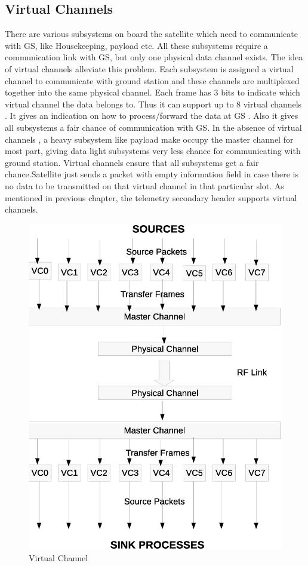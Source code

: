 \documentclass[BTech]{iitmdiss}
\begin{document}
\subsection{Virtual Channels}
There are various subsystems on board the satellite which need to communicate with GS, like Housekeeping, payload  etc. All these subsystems require a communication link with GS, but only one physical data channel exists. The idea of virtual channels alleviate this problem. Each subsystem is assigned a virtual channel to communicate with ground station and these channels are multiplexed together into the same physical channel. Each frame has 3 bits to indicate which virtual channel the data  belongs to. Thus it can support up to 8 virtual channels . It gives an indication on how to process/forward  the data at GS . Also it gives all subsystems a fair chance of communication with GS. In the absence of virtual channels , a heavy subsystem like payload make occupy the master channel for most part, giving data light subsystems very less chance for communicating with ground station. Virtual channels ensure that all subsystems get a fair chance.Satellite just sends a packet with empty information field in case there is no data to be transmitted on that virtual channel in that particular slot.  As mentioned in previous chapter, the telemetry secondary header supports virtual channels. 
\begin{figure}[H]
\includegraphics[scale = 0.65]{vc.eps}
\caption{Virtual Channel}
\label{fig:vc}
\end{figure}
\end{document}
